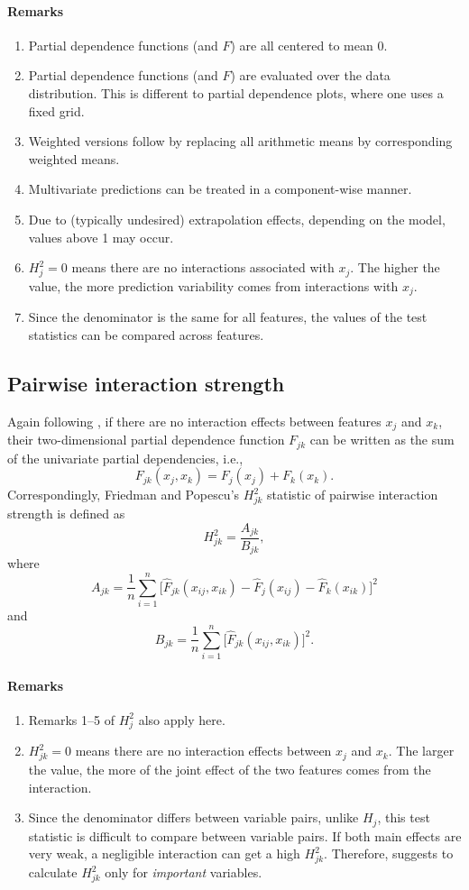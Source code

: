 \documentclass[]{article}
\begin{document}
\paragraph{Remarks}
\begin{enumerate}
	\item Partial dependence functions (and $F$) are all centered to mean 0.
	\item Partial dependence functions (and $F$) are evaluated over the data distribution. This is different to partial dependence plots, where one uses a fixed grid.
	\item Weighted versions follow by replacing all arithmetic means by corresponding weighted means.
	\item Multivariate predictions can be treated in a component-wise manner.
	\item Due to (typically undesired) extrapolation effects, depending on the model, values above 1 may occur.
	\item $H^2_j = 0$ means there are no interactions associated with $x_j$. The higher the value, the more prediction variability comes from interactions with $x_j$.
	\item Since the denominator is the same for all features, the values of the test statistics can be compared across features.
\end{enumerate}

\subsection{Pairwise interaction strength}
Again following \cite{friedman2008}, if there are no interaction effects between features $x_j$ and $x_k$, their two-dimensional partial dependence function $F_{jk}$ can be written as the sum of the univariate partial dependencies, i.e.,
$$
  F_{jk}(x_j, x_k) = F_j(x_j)+ F_k(x_k).
$$
Correspondingly, Friedman and Popescu's $H_{jk}^2$ statistic of pairwise interaction strength is defined as
$$
  H_{jk}^2 = \frac{A_{jk}}{B_{jk}},
$$
where 
$$
  A_{jk} = \frac{1}{n} \sum_{i = 1}^n\big[\hat F_{jk}(x_{ij}, x_{ik}) - \hat F_j(x_{ij}) - \hat F_k(x_{ik})\big]^2
$$
and
$$
  B_{jk} = \frac{1}{n} \sum_{i = 1}^n\big[\hat F_{jk}(x_{ij}, x_{ik})\big]^2.
$$
\paragraph{Remarks}
\begin{enumerate}
	\item Remarks 1--5 of $H^2_{j}$ also apply here.
	\item $H^2_{jk} = 0$ means there are no interaction effects between $x_j$ and $x_k$. The larger the value, the more of the joint effect of the two features comes from the interaction.
	\item Since the denominator differs between variable pairs, unlike $H_j$, this test statistic is difficult to compare between variable pairs. If both main effects are very weak, a negligible interaction can get a high $H^2_{jk}$. Therefore, \cite{friedman2008} suggests to calculate $H^2_{jk}$ only for {\em important} variables.
\end{enumerate}
\end{document}
